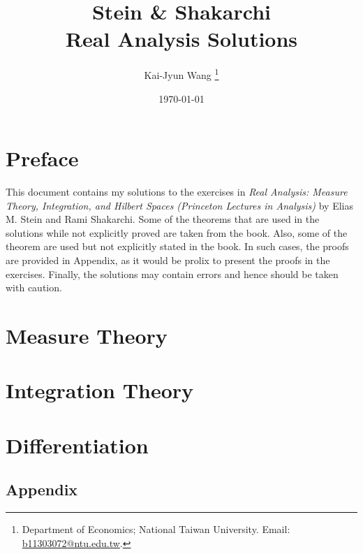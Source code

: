 \documentclass[12pt]{article}
\title{
    Stein \& Shakarchi \\
    Real Analysis Solutions
    }
\author{%
   Kai-Jyun Wang
   \thanks{Department of Economics; National Taiwan University. 
   Email: \url{b11303072@ntu.edu.tw}.}
}
\date{\today}
\begin{document}

\maketitle

\section*{Preface}
This document contains my solutions to the exercises in 
\textit{Real Analysis: Measure Theory, Integration, and 
Hilbert Spaces (Princeton Lectures in Analysis)} by 
Elias M. Stein and Rami Shakarchi. Some of the theorems
that are used in the solutions while not explicitly proved 
are taken from the book. Also, some of the theorem are used 
but not explicitly stated in the book. In such cases, the 
proofs are provided in Appendix, as it would be prolix to 
present the proofs in the exercises. Finally, the solutions 
may contain errors and hence should be taken with caution.

\newpage
\textbf{\tableofcontents}
\newpage

\section{Measure Theory}







\newpage
\section{Integration Theory}






\newpage

\section{Differentiation}

\newpage
\begin{appendices}
    \section{Appendix}
    
\end{appendices}
\end{document}
